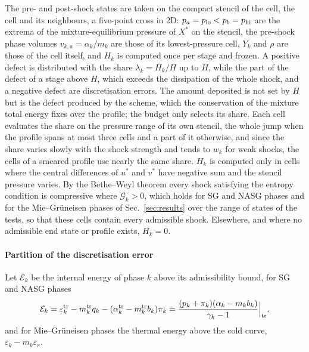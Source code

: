 \documentclass[a4paper,fleqn]{cas-sc}
\begin{document}
The pre- and post-shock states are taken on the compact stencil of the cell, the cell and its neighbours, a five-point cross in 2D:
$p_a=p_{\rm lo}<p_b=p_{\rm hi}$ are the extrema of the mixture-equilibrium pressure of $X^*$ on the stencil, the pre-shock phase
volumes $v_{k,a}=\alpha_k/m_k$ are those of its lowest-pressure cell, $Y_k$ and $\rho$ are those of the cell itself, and $H_k$ is
computed once per stage and frozen. A positive defect is distributed with the share $\lambda_k=H_k/H$ up to $H$, while the part
of the defect of a stage above $H$, which exceeds the dissipation of the whole shock, and a negative defect are
discretisation errors. The amount deposited is not set by $H$ but is the defect produced by the scheme, which the
conservation of the mixture total energy fixes over the profile; the budget only selects its share. Each cell evaluates
the share on the pressure range of its own stencil, the whole jump when the profile spans at most three cells and a part
of it otherwise, and since the share varies slowly with the shock strength and tends to $w_k$ for weak shocks, the cells of
a smeared profile use nearly the same share. $H_k$ is computed only in cells where the central differences of $u^*$ and
$v^*$ have negative sum and the stencil pressure varies. By the Bethe--Weyl theorem \cite{MenikoffPlohr1989} every shock satisfying the
entropy condition is compressive where $\mathcal G_k>0$, which holds for SG and NASG phases and for the Mie--Gr\"uneisen phases
of Sec.~\ref{sec:results} over the range of states of the tests, so that these cells contain every admissible shock. Elsewhere,
and where no admissible end state or profile exists, $H_k=0$.

\paragraph{Partition of the discretisation error}
Let $\mathcal E_k$ be the internal energy of phase $k$ above its admissibility
bound, for SG and NASG phases
\begin{equation}
\mathcal E_k=\varepsilon^{\rm tr}_k-m^{\rm tr}_kq_k-(\alpha^{\rm tr}_k-m^{\rm tr}_kb_k)\pi_k=\frac{(p_k+\pi_k)(\alpha_k-m_kb_k)}{\gamma_k-1}\Big|_{\rm tr},
\label{eq:Ek}
\end{equation}
and for Mie--Gr\"uneisen phases the thermal energy above the cold curve, $\varepsilon_k-m_k\varepsilon_r$.
\end{document}
